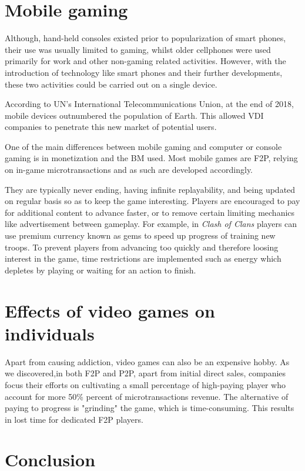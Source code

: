 \documentclass[10pt,british,a4paper,titlepage]{article}
\begin{document}
\section{Mobile gaming} 


Although, hand-held consoles existed prior to popularization of smart phones, their use was usually limited to gaming, whilst older cellphones were used primarily for work and other non-gaming related activities. However, with the introduction of technology like smart phones and their further developments, these two activities could be carried out on a single device. 

According to UN's International Telecommunications Union, at the end of 2018, mobile devices outnumbered the population of Earth. This allowed VDI companies to penetrate this new market of potential users\cite{mayra2020mobile:mob}.   

One of the main differences between mobile gaming and computer or console gaming is in monetization and the BM used. Most mobile games are F2P, relying on in-game microtransactions and as such are developed accordingly.

They are typically never ending, having infinite replayability, and being updated on regular basis so as to keep the game interesting. Players are encouraged to pay for additional content to advance faster, or to remove certain limiting mechanics like advertisement between gameplay. For example, in \emph{Clash of Clans} players can use premium currency known as gems to speed up progress of training new troops. To prevent players from advancing too quickly and therefore loosing interest in the game, time restrictions are implemented such as energy which depletes by playing or waiting for an action to finish\cite{mayra2020mobile:mob}. 

\section{Effects of video games on individuals}

Apart from causing addiction, video games can also be an expensive hobby. As we discovered,in both F2P and P2P, apart from initial direct sales, companies focus their efforts on cultivating a small percentage of high-paying player who account for more 50\% percent of microtransactions revenue. The alternative of paying to progress is "grinding" the game, which is time-consuming. This results in lost time for dedicated F2P players.   


\section{Conclusion}
\end{document}
